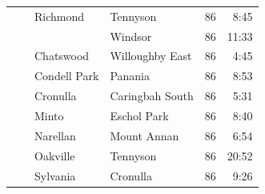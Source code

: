 \documentclass{grattan}
\begin{document}
\begin{longtable}{Nlllrr}
 &                                & Richmond              & Tennyson             & 86  & 8:45 \\
 &                                &                       & Windsor              & 86  & 11:33 \\
 &                                & Chatswood             & Willoughby East      & 86  & 4:45 \\
 &                                & Condell Park          & Panania              & 86  & 8:53 \\
 &                                & Cronulla              & Caringbah South      & 86  & 5:31 \\
 &                                & Minto                 & Eschol Park          & 86  & 8:40 \\
 &                                & Narellan              & Mount Annan          & 86  & 6:54 \\
 &                                & Oakville              & Tennyson             & 86  & 20:52 \\
 &                                & Sylvania              & Cronulla             & 86  & 9:26 \\
  \end{longtable}

\twocolumn







\nocite{R-maptools,R-bindrcpp,R-Census2016.DataPack,R-grattanRoadCongestion2017,R-ASGS,R-zoo,R-rgdal,R-sp,R-hutils,R-xtable,R-data.table,R-magrittr,R-testthat,R-dplyr,R-dtplyr,R-readr,R-lubridate,R-ggrepel,R-scales,R-ggthemes,R-fastmatch,R-viridis,R-viridisLite,R-fst,R-forcats,R-ggjoy,R-grattan,R-broom,R-gridExtra,R-leaflet,R-cowplot,R-ggplot2,R-grattanCharts,R-showtext,R-sysfonts,R-knitr,R-RevoUtilsMath,R-base,R-bomrang}
\printbibliography
\end{document}
